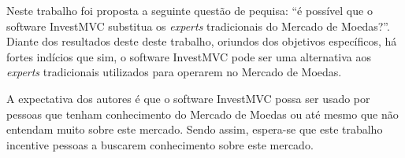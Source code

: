 Neste trabalho foi proposta a seguinte questão de pequisa: “é possível que o software InvestMVC substitua os \textit{experts} tradicionais do Mercado de Moedas?”. Diante dos resultados deste deste trabalho, oriundos dos objetivos específicos, há fortes indícios que sim, o software InvestMVC pode ser uma alternativa aos \textit{experts} tradicionais utilizados para operarem no Mercado de Moedas.


A expectativa dos autores é que o software InvestMVC possa ser usado por pessoas que tenham conhecimento do Mercado de Moedas ou até mesmo que não entendam muito sobre este mercado. Sendo assim, espera-se que este trabalho incentive pessoas a buscarem conhecimento sobre este mercado.